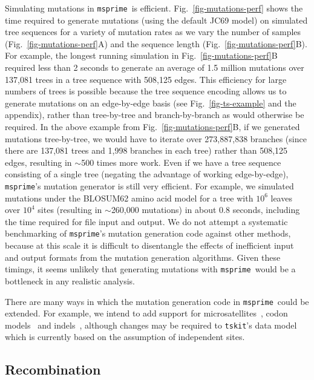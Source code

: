 \documentclass{article}
\newcommand{\msprime}[0]{\texttt{msprime}}
\newcommand{\tskit}[0]{\texttt{tskit}}
\begin{document}
Simulating mutations in \msprime\ is efficient.
Fig.~\ref{fig-mutations-perf} shows the time required to generate
mutations (using the default JC69 model) on
simulated tree sequences for a variety of mutation
rates as we vary the number of samples
(Fig.~\ref{fig-mutations-perf}A) and the sequence
length (Fig.~\ref{fig-mutations-perf}B).
For example, the longest running simulation in
Fig.~\ref{fig-mutations-perf}B required less than 2 seconds to
generate an average of 1.5 million mutations over 137,081 trees
in a tree sequence with 508,125 edges.
This efficiency for large numbers of trees is possible because
the tree sequence encoding allows us to generate mutations
on an edge-by-edge basis
(see Fig.~\ref{fig-ts-example} and the~
appendix),
rather than tree-by-tree and branch-by-branch as would otherwise be required.
In the above example from Fig.~\ref{fig-mutations-perf}B,
if we generated mutations tree-by-tree, we would have to iterate over 273,887,838 branches
(since there are 137,081 trees and 1,998 branches in each
tree) rather than 508,125 edges, resulting in $\sim$500 times more work.
Even if we have a tree sequence consisting of a single tree
(negating the advantage of working edge-by-edge),
\msprime's mutation generator is still very efficient.
For example, we simulated mutations under the BLOSUM62 amino
acid model for a tree with $10^6$ leaves over $10^4$ sites (resulting
in $\sim$260,000 mutations) in about $0.8$ seconds, including
the time required for file input and output.
We do not attempt a systematic benchmarking of \msprime's
mutation generation code against other methods, because at this scale it is
difficult to disentangle the effects of inefficient input and
output formats from the mutation generation algorithms.
Given these timings, it seems unlikely
that generating mutations with \msprime\ would be a bottleneck in any
realistic analysis.

There are many ways in which the mutation generation code
in \msprime\ could be extended. For example, we intend to add support for
microsatellites~\citep{mailund2005coasim},
codon models~\citep{arenas2007recodon}
and indels~\citep{cartwright2005dna,fletcher2009indelible},
although changes may be required to \tskit's data model
which is currently based on the assumption of independent sites.

\subsection*{Recombination}
\label{sec-recombination}
\end{document}
